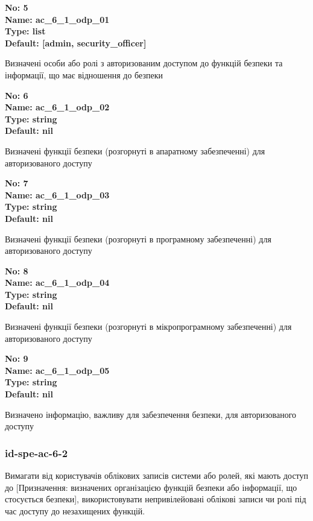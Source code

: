 \documentclass{article}
\begin{document}
{\footnotesize\bfseries
No: 5\\
Name: ac\_\allowbreak{}6\_\allowbreak{}1\_\allowbreak{}odp\_\allowbreak{}01\\
Type: list\\
Default: [\textquotedbl{}admin\textquotedbl{}, \textquotedbl{}security\_\allowbreak{}officer\textquotedbl{}]
}

{\footnotesize Визначені особи або ролі з авторизованим доступом до функцій безпеки та інформації, що має відношення до безпеки}


{\footnotesize\bfseries
No: 6\\
Name: ac\_\allowbreak{}6\_\allowbreak{}1\_\allowbreak{}odp\_\allowbreak{}02\\
Type: string\\
Default: nil
}

{\footnotesize Визначені функції безпеки (розгорнуті в апаратному забезпеченні) для авторизованого доступу}


{\footnotesize\bfseries
No: 7\\
Name: ac\_\allowbreak{}6\_\allowbreak{}1\_\allowbreak{}odp\_\allowbreak{}03\\
Type: string\\
Default: nil
}

{\footnotesize Визначені функції безпеки (розгорнуті в програмному забезпеченні) для авторизованого доступу}


{\footnotesize\bfseries
No: 8\\
Name: ac\_\allowbreak{}6\_\allowbreak{}1\_\allowbreak{}odp\_\allowbreak{}04\\
Type: string\\
Default: nil
}

{\footnotesize Визначені функції безпеки (розгорнуті в мікропрограмному забезпеченні) для авторизованого доступу}


{\footnotesize\bfseries
No: 9\\
Name: ac\_\allowbreak{}6\_\allowbreak{}1\_\allowbreak{}odp\_\allowbreak{}05\\
Type: string\\
Default: nil
}

{\footnotesize Визначено інформацію, важливу для забезпечення безпеки, для авторизованого доступу}




\subsubsection{id-spe-ac-6-2}
Вимагати від користувачів облікових записів системи або ролей, які мають доступ до [Призначення: визначених організацією функцій безпеки або інформації, що стосується безпеки], використовувати непривілейовані облікові записи чи ролі під час доступу до незахищених функцій.
\end{document}
